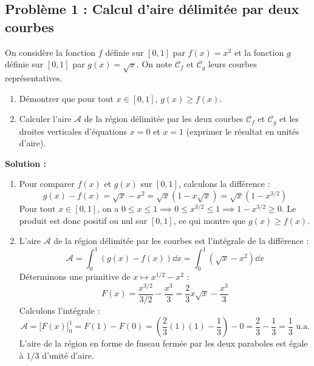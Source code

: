 \subsection*{Problème 1 : Calcul d'aire délimitée par deux courbes}
On considère la fonction $f$ définie sur $[0, 1]$ par $f(x) = x^2$ et la fonction $g$ définie sur $[0, 1]$ par $g(x) = \sqrt{x}$. On note $\mathcal{C}_f$ et $\mathcal{C}_g$ leurs courbes représentatives.
\begin{enumerate}
    \item Démontrer que pour tout $x \in [0, 1]$, $g(x) \ge f(x)$.
    \item Calculer l'aire $\mathcal{A}$ de la région délimitée par les deux courbes $\mathcal{C}_f$ et $\mathcal{C}_g$ et les droites verticales d'équations $x=0$ et $x=1$ (exprimer le résultat en unités d'aire).
\end{enumerate}

\textbf{Solution :}
\begin{enumerate}
    \item Pour comparer $f(x)$ et $g(x)$ sur $[0, 1]$, calculons la différence :
    \[
    g(x) - f(x) = \sqrt{x} - x^2 = \sqrt{x}(1 - x\sqrt{x}) = \sqrt{x}(1 - x^{3/2})
    \]
    Pour tout $x \in [0, 1]$, on a $0 \le x \le 1 \implies 0 \le x^{3/2} \le 1 \implies 1 - x^{3/2} \ge 0$.
    Le produit est donc positif ou nul sur $[0, 1]$, ce qui montre que $g(x) \ge f(x)$.
    
    \item L'aire $\mathcal{A}$ de la région délimitée par les courbes est l'intégrale de la différence :
    \[
    \mathcal{A} = \int_0^1 (g(x) - f(x)) \dd x = \int_0^1 \left( \sqrt{x} - x^2 \right) \dd x
    \]
    Déterminons une primitive de $x \mapsto x^{1/2} - x^2$ :
    \[
    F(x) = \frac{x^{3/2}}{3/2} - \frac{x^3}{3} = \frac{2}{3}x\sqrt{x} - \frac{x^3}{3}
    \]
    Calculons l'intégrale :
    \[
    \mathcal{A} = \Big[ F(x) \Big]_0^1 = F(1) - F(0) = \left( \frac{2}{3}(1)(1) - \frac{1}{3} \right) - 0 = \frac{2}{3} - \frac{1}{3} = \frac{1}{3} \text{ u.a.}
    \]
    L'aire de la région en forme de fuseau fermée par les deux paraboles est égale à $1/3$ d'unité d'aire.
\end{enumerate}

